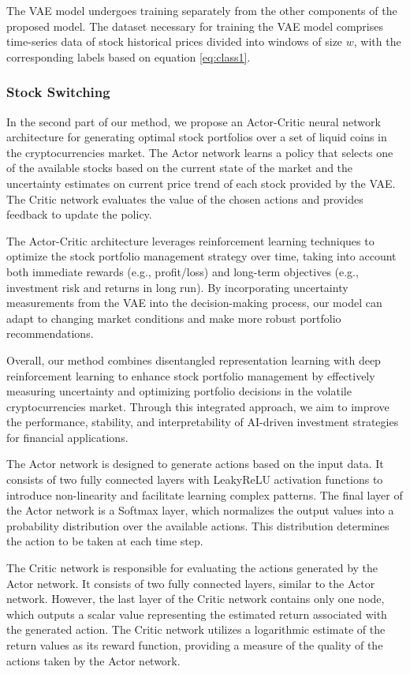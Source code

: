 The VAE model undergoes training separately from the other components of the proposed model. The dataset necessary for training the VAE model comprises time-series data of stock historical prices divided into windows of size $w$, with the corresponding labels based on equation \eqref{eq:class1}.

\subsubsection{Stock Switching}

In the second part of our method, we propose an Actor-Critic neural network architecture for generating optimal stock portfolios over a set of liquid coins in the cryptocurrencies market. The Actor network learns a policy that selects one of the available stocks based on the current state of the market and the uncertainty estimates on current price trend of each stock provided by the VAE. The Critic network evaluates the value of the chosen actions and provides feedback to update the policy.

The Actor-Critic architecture leverages reinforcement learning techniques to optimize the stock portfolio management strategy over time, taking into account both immediate rewards (e.g., profit/loss) and long-term objectives (e.g., investment risk and returns in long run). By incorporating uncertainty measurements from the VAE into the decision-making process, our model can adapt to changing market conditions and make more robust portfolio recommendations.

Overall, our method combines disentangled representation learning with deep reinforcement learning to enhance stock portfolio management by effectively measuring uncertainty and optimizing portfolio decisions in the volatile cryptocurrencies market. Through this integrated approach, we aim to improve the performance, stability, and interpretability of AI-driven investment strategies for financial applications.

The Actor network is designed to generate actions based on the input data. It consists of two fully connected layers with LeakyReLU activation functions to introduce non-linearity and facilitate learning complex patterns. The final layer of the Actor network is a Softmax layer, which normalizes the output values into a probability distribution over the available actions. This distribution determines the action to be taken at each time step.

The Critic network is responsible for evaluating the actions generated by the Actor network. It consists of two fully connected layers, similar to the Actor network. However, the last layer of the Critic network contains only one node, which outputs a scalar value representing the estimated return associated with the generated action. The Critic network utilizes a logarithmic estimate of the return values as its reward function, providing a measure of the quality of the actions taken by the Actor network.

